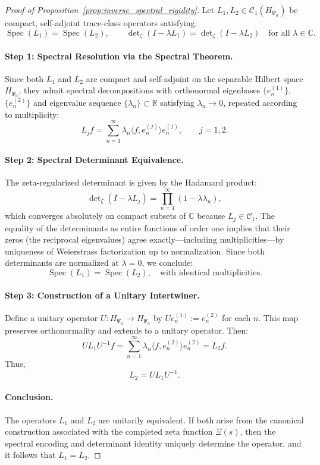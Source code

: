 \begin{proof}[Proof of Proposition~\ref{prop:inverse_spectral_rigidity}]
Let \( L_1, L_2 \in \mathcal{C}_1(H_{\Psi_\alpha}) \) be compact, self-adjoint trace-class operators satisfying:
\[
\operatorname{Spec}(L_1) = \operatorname{Spec}(L_2), \qquad
\det\nolimits_\zeta(I - \lambda L_1) = \det\nolimits_\zeta(I - \lambda L_2) \quad \text{for all } \lambda \in \mathbb{C}.
\]

\paragraph{Step 1: Spectral Resolution via the Spectral Theorem.}
Since both \( L_1 \) and \( L_2 \) are compact and self-adjoint on the separable Hilbert space \( H_{\Psi_\alpha} \), they admit spectral decompositions with orthonormal eigenbases \( \{e_n^{(1)}\} \), \( \{e_n^{(2)}\} \) and eigenvalue sequence \( \{\lambda_n\} \subset \mathbb{R} \) satisfying \( \lambda_n \to 0 \), repeated according to multiplicity:
\[
L_j f = \sum_{n=1}^\infty \lambda_n \langle f, e_n^{(j)} \rangle e_n^{(j)}, \qquad j = 1,2.
\]

\paragraph{Step 2: Spectral Determinant Equivalence.}
The zeta-regularized determinant is given by the Hadamard product:
\[
\det\nolimits_\zeta(I - \lambda L_j) = \prod_{n=1}^\infty (1 - \lambda \lambda_n),
\]
which converges absolutely on compact subsets of \( \mathbb{C} \) because \( L_j \in \mathcal{C}_1 \). The equality of the determinants as entire functions of order one implies that their zeros (the reciprocal eigenvalues) agree exactly—including multiplicities—by uniqueness of Weierstrass factorization up to normalization. Since both determinants are normalized at \( \lambda = 0 \), we conclude:
\[
\operatorname{Spec}(L_1) = \operatorname{Spec}(L_2), \quad \text{with identical multiplicities}.
\]

\paragraph{Step 3: Construction of a Unitary Intertwiner.}
Define a unitary operator \( U : H_{\Psi_\alpha} \to H_{\Psi_\alpha} \) by \( U e_n^{(1)} := e_n^{(2)} \) for each \( n \). This map preserves orthonormality and extends to a unitary operator. Then:
\[
U L_1 U^{-1} f = \sum_{n=1}^\infty \lambda_n \langle f, e_n^{(2)} \rangle e_n^{(2)} = L_2 f.
\]
Thus,
\[
L_2 = U L_1 U^{-1}.
\]

\paragraph{Conclusion.}
The operators \( L_1 \) and \( L_2 \) are unitarily equivalent. If both arise from the canonical construction associated with the completed zeta function \( \Xi(s) \), then the spectral encoding and determinant identity uniquely determine the operator, and it follows that \( L_1 = L_2 \).
\end{proof}
